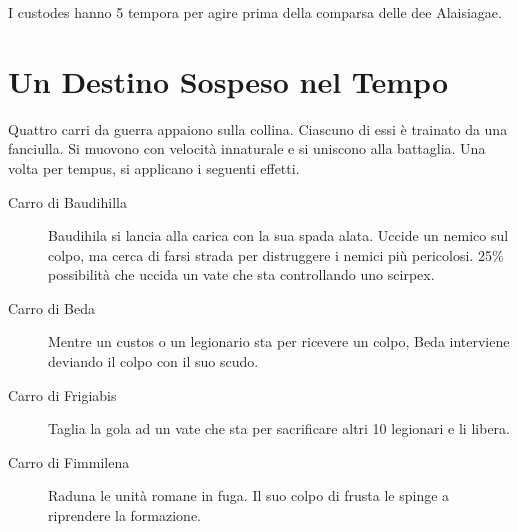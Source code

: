\documentclass[11.5pt,twocolumn]{article}
\begin{document}

I custodes hanno 5 tempora per agire prima della comparsa delle dee Alaisiagae.

\section{Un Destino Sospeso nel Tempo}
%
Quattro carri da guerra appaiono sulla collina.
Ciascuno di essi \`{e} trainato da una fanciulla.
Si muovono con velocit\`{a} innaturale e si uniscono alla battaglia.
Una volta per tempus, si applicano i seguenti effetti.
\begin{description}
\item[Carro di Baudihilla] Baudihila si lancia alla carica con la sua spada alata. Uccide un nemico sul colpo, ma cerca di farsi strada per distruggere i nemici pi\`{u} pericolosi. 25\% possibilit\`{a} che uccida un vate che sta controllando uno scirpex.
\item[Carro di Beda] Mentre un custos o un legionario sta per ricevere un colpo, Beda interviene deviando il colpo con il suo scudo.
\item[Carro di Frigiabis] Taglia la gola ad un vate che sta per sacrificare altri 10 legionari e li libera.
\item[Carro di Fimmilena] Raduna le unit\`{a} romane in fuga. Il suo colpo di frusta le spinge a riprendere la formazione.
\end{description}
\end{document}
